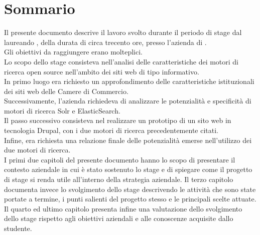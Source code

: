 
\cleardoublepage
{}
{}
\begingroup
\let\clearpage\relax
\let\cleardoublepage\relax
\let\cleardoublepage\relax

\chapter*{Sommario}

Il presente documento descrive il lavoro svolto durante il periodo di stage dal laureando \autore, della durata di circa trecento ore, presso l'azienda \nomeAzienda di \locazioneAzienda. \\
Gli obiettivi da raggiungere erano molteplici. \\
Lo scopo dello stage consisteva nell'analisi delle caratteristiche dei motori di ricerca \gls{open source} nell'ambito dei siti web di tipo informativo.\\
In primo luogo era richiesto un approfondimento delle caratteristiche istituzionali dei siti web delle Camere di Commercio. \\
Successivamente, l'azienda richiedeva di analizzare le potenzialità e specificità di motori di ricerca \gls{Solr} e \gls{ElasticSearch}. \\
Il passo successivo consisteva nel realizzare un prototipo di un sito web in tecnologia \gls{Drupal}, con i due motori di ricerca precedentemente citati. \\
Infine, era richiesta una relazione finale delle potenzialità emerse nell'utilizzo dei due motori di ricerca. \\
I primi due capitoli del presente documento hanno lo scopo di presentare il contesto aziendale in cui è stato sostenuto lo stage e di spiegare come il progetto di stage si renda utile all’interno della strategia aziendale. Il terzo capitolo documenta invece lo svolgimento dello stage descrivendo le attività che sono state portate a termine, i punti salienti del progetto stesso e le principali scelte attuate. Il quarto ed ultimo capitolo presenta infine una valutazione dello svolgimento dello stage rispetto agli obiettivi aziendali e alle conoscenze acquisite dallo studente.


\endgroup

\vfill